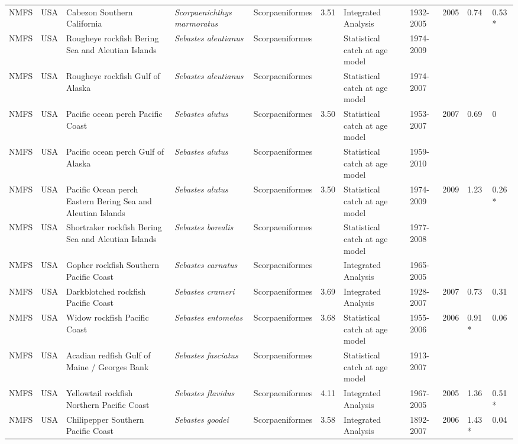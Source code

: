\begin{longtable}{p{1.5cm}p{1.5cm}p{3cm}p{3cm}p{2.5cm}p{0.9cm}p{1.4cm}p{0.9cm}p{0.9cm}p{0.9cm}p{1cm}}
  NMFS & USA & Cabezon Southern California & \textit{Scorpaenichthys marmoratus} & Scorpaeniformes & 3.51 & Integrated Analysis & 1932-2005 & 2005 & 0.74 & 0.53 * \\ 
  NMFS & USA & Rougheye rockfish Bering Sea and Aleutian Islands & \textit{Sebastes aleutianus} & Scorpaeniformes &  & Statistical catch at age model & 1974-2009 &  &  &  \\ 
  NMFS & USA & Rougheye rockfish Gulf of Alaska & \textit{Sebastes aleutianus} & Scorpaeniformes &  & Statistical catch at age model & 1974-2007 &  &  &  \\ 
  NMFS & USA & Pacific ocean perch Pacific Coast & \textit{Sebastes alutus} & Scorpaeniformes & 3.50 & Statistical catch at age model & 1953-2007 & 2007 & 0.69 & 0 \\ 
  NMFS & USA & Pacific ocean perch Gulf of Alaska & \textit{Sebastes alutus} & Scorpaeniformes &  & Statistical catch at age model & 1959-2010 &  &  &  \\ 
  NMFS & USA & Pacific Ocean perch Eastern Bering Sea and Aleutian Islands & \textit{Sebastes alutus} & Scorpaeniformes & 3.50 & Statistical catch at age model & 1974-2009 & 2009 & 1.23 & 0.26 * \\ 
  NMFS & USA & Shortraker rockfish Bering Sea and Aleutian Islands & \textit{Sebastes borealis} & Scorpaeniformes &  & Statistical catch at age model & 1977-2008 &  &  &  \\ 
  NMFS & USA & Gopher rockfish Southern Pacific Coast & \textit{Sebastes carnatus} & Scorpaeniformes &  & Integrated Analysis & 1965-2005 &  &  &  \\ 
  NMFS & USA & Darkblotched rockfish Pacific Coast & \textit{Sebastes crameri} & Scorpaeniformes & 3.69 & Integrated Analysis & 1928-2007 & 2007 & 0.73 & 0.31 \\ 
  NMFS & USA & Widow rockfish Pacific Coast & \textit{Sebastes entomelas} & Scorpaeniformes & 3.68 & Statistical catch at age model & 1955-2006 & 2006 & 0.91 * & 0.06 \\ 
  NMFS & USA & Acadian redfish Gulf of Maine / Georges Bank & \textit{Sebastes fasciatus} & Scorpaeniformes &  & Statistical catch at age model & 1913-2007 &  &  &  \\ 
  NMFS & USA & Yellowtail rockfish Northern Pacific Coast & \textit{Sebastes flavidus} & Scorpaeniformes & 4.11 & Integrated Analysis & 1967-2005 & 2005 & 1.36 & 0.51 * \\ 
  NMFS & USA & Chilipepper Southern Pacific Coast & \textit{Sebastes goodei} & Scorpaeniformes & 3.58 & Integrated Analysis & 1892-2007 & 2006 & 1.43 * & 0.04 \\ 

\end{longtable}

